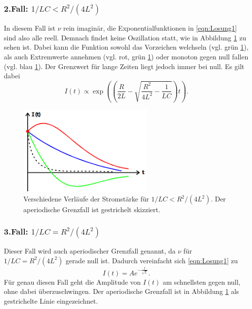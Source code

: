 \subsubsection*{2.Fall: $1/LC<R^2/(4L^2)$}
In diesem Fall ist $\nu$ rein imaginär, die Exponentialfunktionen in \eqref{eqn:Losung1} sind also alle reell. Demnach findet keine Oszillation
statt, wie in Abbildung \ref{fig:Fall2} zu sehen ist. Dabei kann die Funktion sowohl das Vorzeichen welchseln (vgl. grün \ref{fig:Fall2}), als
auch Extremwerte annehmen (vgl. rot, grün \ref{fig:Fall2}) oder monoton gegen null fallen (vgl. blau \ref{fig:Fall2}). Der Grenzwert für lange
Zeiten liegt jedoch immer bei null. Es gilt dabei
\begin{equation*}
    I(t)\propto \exp\left(\left(\frac{R}{2L}-\sqrt{\frac{R^2}{4L^2}-\frac{1}{LC}}\right)t\right)    .
\end{equation*}
\begin{figure}[H]
    \centering
    \includegraphics[width=0.6\textwidth]{pictures/Fall2.png}
    \caption{Verschiedene Verläufe der Stromstärke für $1/LC<R^2/(4L^2)$. Der aperiodische Grenzfall ist gestrichelt skizziert.\cite{AP01}}
    \label{fig:Fall2}
\end{figure}

\subsubsection*{3.Fall: $1/LC=R^2/(4L^2)$}
\label{sec:Fall3}
Dieser Fall wird auch aperiodischer Grenzfall genannt, da $\nu$ für $1/LC=R^2/(4L^2)$ gerade null ist. Dadurch vereinfacht sich \eqref{eqn:Losung1}
zu 
\begin{equation*}
    I(t)=Ae^{-\frac{t}{\sqrt{L}}}   .
\end{equation*}
Für genau diesen Fall geht die Amplitude von $I(t)$ am schnellsten gegen null, ohne dabei überzuschwingen. Der aperiodische Grenzfall ist in 
Abbildung \ref{fig:Fall2} als gestrichelte Linie eingezeichnet. 

